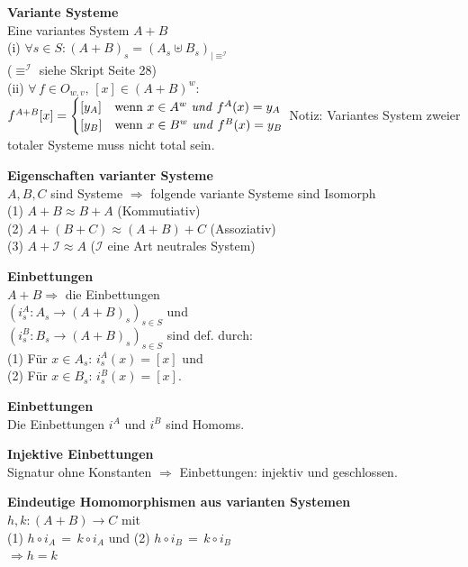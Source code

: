 \begin{multicols}{2}
\textbf{ Variante Systeme} \\
Eine variantes System $A  + B$  \\
(i) $\forall s \in S: \left(A + B\right)_{s}= \left(A_{s}\uplus B_{s}\right)_{|\equiv^{\mathcal{I}}}$ \\ ($\equiv^{\mathcal{I}}$ siehe Skript Seite 28)\\
(ii) $\forall \, f\in O_{w,v},\, [x] \in\left(A + B\right)^{w}:$\\$f^{A + B}[x]= \begin{cases}
\left[y_{A}\right] & \textrm{wenn \ensuremath{x\in A^{w}\textrm{ \emph{und} }}}f^{A}(x)=y_{A}\\
\left[y_{B}\right] & \textrm{wenn \ensuremath{x\in B^{w}\textrm{ \emph{und} }}}f^{B}(x)=y_{B}
\end{cases}$
Notiz: Variantes System zweier totaler Systeme muss nicht total sein.



\textbf{ Eigenschaften varianter Systeme} \\
$A,B,C$ sind Systeme $\Rightarrow$ folgende variante Systeme sind Isomorph \\
(1) $A + B \approx B + A$ (Kommutiativ)\\
(2) $A + (B + C) \approx (A + B) + C$ (Assoziativ) \\
(3) $A + \mathcal{I} \approx A$ ($\mathcal{I}$ eine Art neutrales System)


\textbf{ Einbettungen} \\
$A + B \Rightarrow$  die Einbettungen \\ 
$\left(i_{s}^{A}:A_{s}\rightarrow\left(A+B\right)_{s}\right)_{s\in S}$
und \\ $\left(i_{s}^{B}:B_{s}\rightarrow\left(A+B\right)_{s}\right)_{s\in S}$
sind def. durch: \\ (1) Für $x\in A_{s}$: $i_{s}^{A}(x)=[x]$ und \\ (2) Für $x\in B_{s}$: $i_{s}^{B}(x)=[x]$.

\textbf{ Einbettungen} \\
Die Einbettungen $i^A$ und $i^B$ sind Homoms.

\textbf{ Injektive Einbettungen} \\
Signatur ohne Konstanten $\Rightarrow$ Einbettungen: injektiv und geschlossen.

\textbf{ Eindeutige Homomorphismen aus varianten Systemen} \\
$h,k: (A+B) \rightarrow C$ \homos mit \\
(1) $h \circ i_A \, = \, k \circ i_A$ und 
(2) $h \circ i_B \, = \, k \circ i_B$\\$ \Rightarrow h = k$
\end{multicols}


